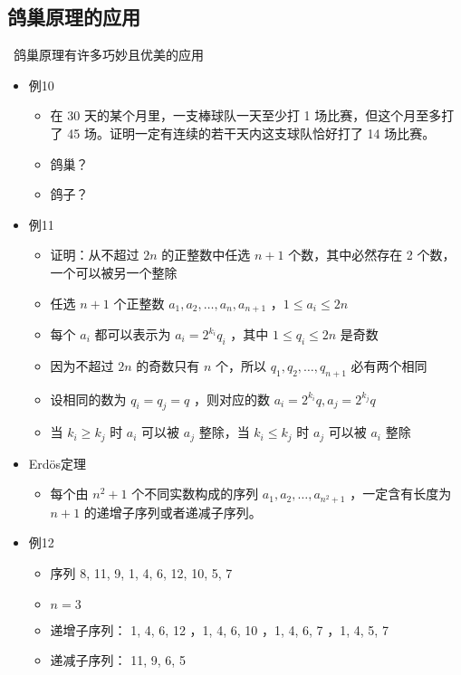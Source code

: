 \documentclass[UTF8]{report}
\theoremstyle{MyLineTheoremStyle} %
\theoremstyle{MyBlockTheoremStyle} %
\theoremstyle{MySubsubsectionStyle} %
\begin{document}
\subsection{鸽巢原理的应用}
\textbullet\ 鸽巢原理有许多巧妙且优美的应用
\begin{itemize}
    \item 例10
    \begin{itemize}
        \item 在 30 天的某个月里，一支棒球队一天至少打 1 场比赛，但这个月至多打了 45 场。证明一定有连续的若干天内这支球队恰好打了 14 场比赛。
        \item 鸽巢？
        \item 鸽子？
    \end{itemize}
    \item 例11
    \begin{itemize}
        \item 证明：从不超过 $2n$ 的正整数中任选 $n + 1$ 个数，其中必然存在 2 个数，一个可以被另一个整除
        \item 任选 $n + 1$ 个正整数 $a_1, a_2, \ldots , a_n, a_{n+1}$ ，$1 \leq a_i \leq 2n$
        \item 每个 $a_i$ 都可以表示为 $a_i = 2^{k_i}q_i$ ，其中 $1 \leq q_i \leq 2n$ 是奇数
        \item 因为不超过 $2n$ 的奇数只有 $n$ 个，所以 $q_1, q_2, \ldots , q_{n+1}$ 必有两个相同
        \item 设相同的数为 $q_i = q_j = q$ ，则对应的数 $a_i = 2^{k_i}q, a_j = 2^{k_j}q$
        \item 当 $k_i \geq k_j$ 时 $a_i$ 可以被 $a_j$ 整除，当 $k_i \leq k_j$ 时 $a_j$ 可以被 $a_i$ 整除
    \end{itemize}
    \item Erdös定理
    \begin{itemize}
        \item 每个由 $n^2 + 1$ 个不同实数构成的序列 $a_1, a_2, \ldots , a_{n^2+1}$ ，一定含有长度为 $n + 1$ 的递增子序列或者递减子序列。
    \end{itemize}
    \item 例12
    \begin{itemize}
        \item 序列 8, 11, 9, 1, 4, 6, 12, 10, 5, 7
        \item $n = 3$
        \item 递增子序列： 1, 4, 6, 12 ，1, 4, 6, 10 ，1, 4, 6, 7 ，1, 4, 5, 7
        \item 递减子序列： 11, 9, 6, 5
    \end{itemize}

\end{itemize}
\end{document}
